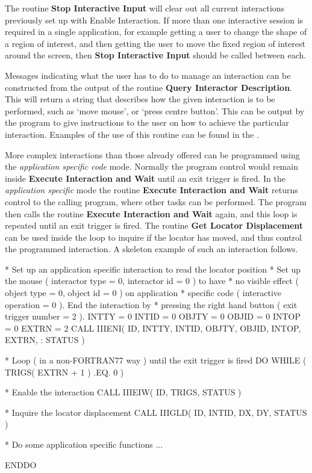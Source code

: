 \documentclass[11pt,nolof]{starlink}
\begin{document}
The routine \textbf{Stop Interactive Input} will clear out all current
interactions previously set up with {Enable Interaction}. If more than
one interactive session is required in a single application, for
example getting a user to change the shape of a region of interest,
and then getting the user to move the fixed region of interest around
the screen, then \textbf{Stop Interactive Input} should be called between
each.

Messages indicating what the user has to do to manage an interaction
can be constructed from the output of the routine
\textbf{Query Interactor Description}. This will return a string that describes
how the given interaction is to be performed, such as `move mouse', or
`press centre button'. This can be output by the program to give
instructions to the user on how to achieve the particular interaction.
Examples of the use of this routine can be found in the
.

More complex interactions than those already offered can be programmed
using the \textit{application specific code} mode. Normally the program control
would remain inside \textbf{Execute Interaction and Wait} until an exit
trigger is fired. In the \textit{application specific} mode the routine
\textbf{Execute Interaction and Wait} returns control to the calling program,
where other tasks can be performed. The program then calls the routine
\textbf{Execute Interaction and Wait} again, and this loop is repeated until
an exit trigger is fired. The routine \textbf{Get Locator Displacement} can
be used inside the loop to inquire if the locator has moved,
and thus control the programmed interaction. A skeleton example of
such an interaction follows.
\begin{small}
\begin{terminalv}
*   Set up an application specific interaction to read the locator position
*   Set up the mouse ( interactor type = 0, interactor id = 0 ) to have
*   no visible effect ( object type = 0, object id = 0 ) on application
*   specific code ( interactive operation = 0 ). End the interaction by
*   pressing the right hand button ( exit trigger number = 2 ).
      INTTY = 0
      INTID = 0
      OBJTY = 0
      OBJID = 0
      INTOP = 0
      EXTRN = 2
      CALL IIIENI( ID, INTTY, INTID, OBJTY, OBJID, INTOP, EXTRN,
     :             STATUS )

*   Loop ( in a non-FORTRAN77 way ) until the exit trigger is fired
      DO WHILE ( TRIGS( EXTRN + 1 ) .EQ. 0 )

*   Enable the interaction
         CALL IIIEIW( ID, TRIGS, STATUS )

*   Inquire the locator displacement
         CALL IIIGLD( ID, INTID, DX, DY, STATUS )

*   Do some application specific functions
         ...

      ENDDO
\end{terminalv}
\end{small}
\end{document}
